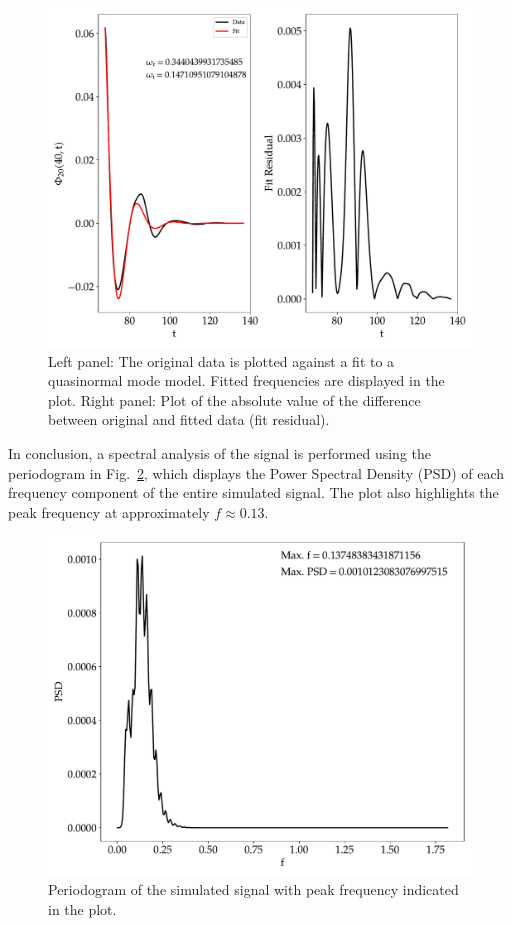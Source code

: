 \begin{figure}[h]
  \centering
  \includegraphics[width=\linewidth]{img/wave_scattering/fit_plot}
  \caption{Left panel: The original data is plotted against a fit to a quasinormal mode model. Fitted frequencies are displayed in the plot. Right panel: Plot of the absolute value of the difference between original and fitted data (fit residual). }
  \label{fig:multipolar_plots_fit}
\end{figure}

In conclusion, a spectral analysis of the signal is performed using the periodogram in Fig.~\ref{fig:multipolar_plots_psd}, which displays the Power Spectral Density (PSD) of each frequency component of the entire simulated signal. The plot also highlights the peak frequency at approximately $f\approx0.13$.

\begin{figure}[h]
  \centering
  \includegraphics[width=\linewidth]{img/wave_scattering/psd_plot}
  \caption{Periodogram of the simulated signal with peak frequency indicated in the plot.}
  \label{fig:multipolar_plots_psd}
\end{figure}